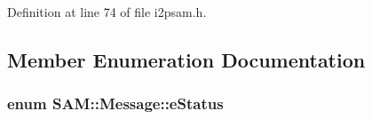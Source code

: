 Definition at line 74 of file i2psam.\+h.



\subsection{Member Enumeration Documentation}
\hypertarget{class_s_a_m_1_1_message_a5f7e317defb90f107fc1a017a4552ae9}{}
\subsubsection[{e\+Status}]{\setlength{\rightskip}{0pt plus 5cm}enum {\bf S\+A\+M\+::\+Message\+::e\+Status}}\label{class_s_a_m_1_1_message_a5f7e317defb90f107fc1a017a4552ae9}
